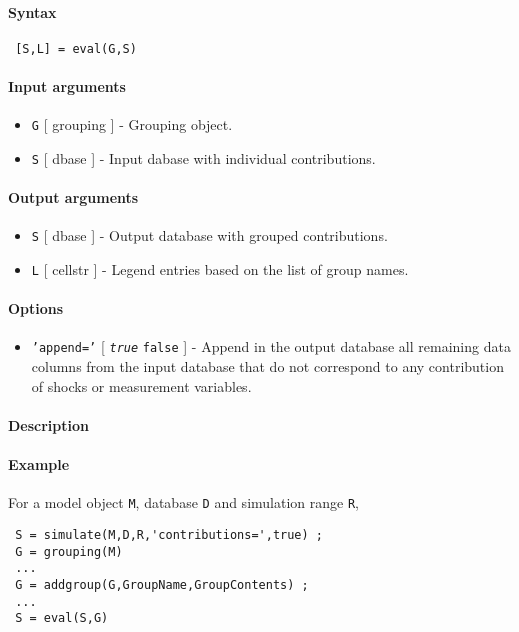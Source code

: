 


	\paragraph{Syntax}
 
 \begin{verbatim}
 [S,L] = eval(G,S)
 \end{verbatim}
 
 \paragraph{Input arguments}
 
 \begin{itemize}
 \item
   \texttt{G} {[} grouping {]} - Grouping object.
 \item
   \texttt{S} {[} dbase {]} - Input dabase with individual contributions.
 \end{itemize}
 
 \paragraph{Output arguments}
 
 \begin{itemize}
 \item
   \texttt{S} {[} dbase {]} - Output database with grouped contributions.
 \item
   \texttt{L} {[} cellstr {]} - Legend entries based on the list of group
   names.
 \end{itemize}
 
 \paragraph{Options}
 
 \begin{itemize}
 \item
   \texttt{'append='} {[} \emph{\texttt{true}} \textbar{} \texttt{false}
   {]} - Append in the output database all remaining data columns from
   the input database that do not correspond to any contribution of
   shocks or measurement variables.
 \end{itemize}
 
 \paragraph{Description}
 
 \paragraph{Example}
 
 For a model object \texttt{M}, database \texttt{D} and simulation range
 \texttt{R},
 
 \begin{verbatim}
 S = simulate(M,D,R,'contributions=',true) ;
 G = grouping(M)
 ...
 G = addgroup(G,GroupName,GroupContents) ;
 ...
 S = eval(S,G)
 \end{verbatim}


